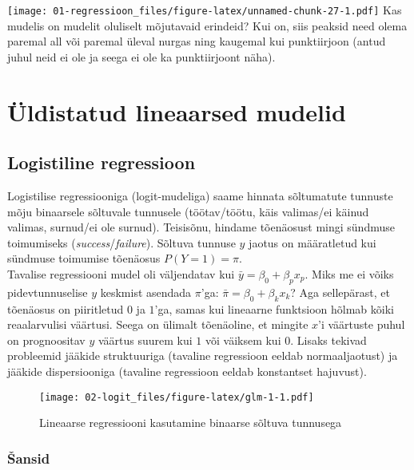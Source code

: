 \documentclass[
]{book}
\begin{document}
\texttt{[image: 01-regressioon\_files/figure-latex/unnamed-chunk-27-1.pdf]}
Kas mudelis on mudelit oluliselt mõjutavaid erindeid? Kui on, siis peaksid need olema paremal all või paremal üleval nurgas ning kaugemal kui punktiirjoon (antud juhul neid ei ole ja seega ei ole ka punktiirjoont näha).

\hypertarget{part-uxfcldistatud-lineaarsed-mudelid}{%
\part{Üldistatud lineaarsed mudelid}\label{part-uxfcldistatud-lineaarsed-mudelid}}

\hypertarget{logistiline-regressioon}{%
\chapter{Logistiline regressioon}\label{logistiline-regressioon}}

Logistilise regressiooniga (logit-mudeliga) saame hinnata sõltumatute tunnuste mõju binaarsele sõltuvale tunnusele (töötav/töötu, käis valimas/ei käinud valimas, surnud/ei ole surnud). Teisisõnu, hindame tõenäosust mingi sündmuse toimumiseks (\emph{success}/\emph{failure}). Sõltuva tunnuse \(y\) jaotus on määratletud kui sündmuse toimumise tõenäosus \(P(Y=1)=\pi\).\\
Tavalise regressiooni mudel oli väljendatav kui \(\bar{y}=\beta_0+\beta_p x_p\). Miks me ei võiks pidevtunnuselise \(y\) keskmist asendada \(\pi\)'ga: \(\bar{\pi}=\beta_0+\beta_k x_k\)? Aga sellepärast, et tõenäosus on piiritletud \(0\) ja \(1\)'ga, samas kui lineaarne funktsioon hõlmab kõiki reaalarvulisi väärtusi. Seega on ülimalt tõenäoline, et mingite \(x\)'i väärtuste puhul on prognoositav \(y\) väärtus suurem kui \(1\) või väiksem kui \(0\). Lisaks tekivad probleemid jääkide struktuuriga (tavaline regressioon eeldab normaaljaotust) ja jääkide dispersiooniga (tavaline regressioon eeldab konstantset hajuvust).

\begin{figure}
\centering
\texttt{[image: 02-logit\_files/figure-latex/glm-1-1.pdf]}
\caption{\label{fig:glm-1}Lineaarse regressiooni kasutamine binaarse sõltuva tunnusega}
\end{figure}

\hypertarget{ux161ansid}{%
\section{Šansid}\label{ux161ansid}}
\end{document}
